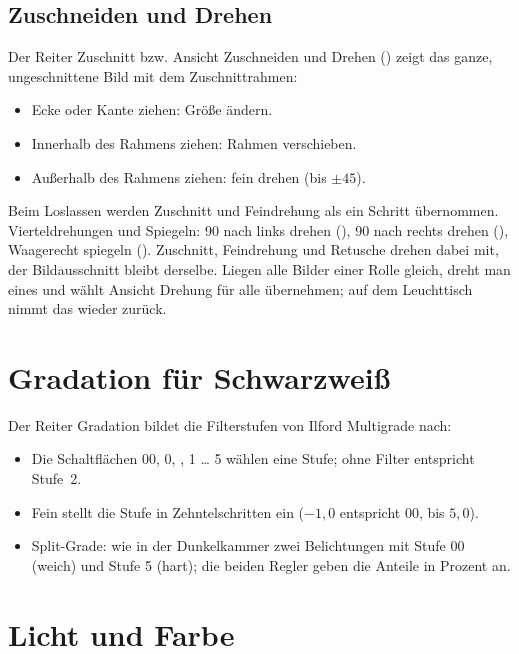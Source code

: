 \documentclass[a4paper,11pt,parskip=half,DIV=12]{scrartcl}
\newcommand{\menu}[1]{\textsf{#1}}                    %
\newcommand{\taste}[1]{\fbox{\footnotesize\textsf{#1}}} %
\begin{document}
\subsection{Zuschneiden und Drehen}
Der Reiter \menu{Zuschnitt} bzw. \menu{Ansicht \textrightarrow{} Zuschneiden und Drehen}
(\taste{C}) zeigt das ganze,
ungeschnittene Bild mit dem Zuschnittrahmen:
\begin{itemize}
  \item Ecke oder Kante ziehen: Größe ändern.
  \item Innerhalb des Rahmens ziehen: Rahmen verschieben.
  \item Außerhalb des Rahmens ziehen: fein drehen (bis $\pm 45$\textdegree).
\end{itemize}
Beim Loslassen werden Zuschnitt und Feindrehung als ein Schritt übernommen.
Vierteldrehungen und Spiegeln: \menu{90\textdegree{} nach links drehen} (\taste{Strg+[}),
\menu{90\textdegree{} nach rechts drehen} (\taste{Strg+]}), \menu{Waagerecht spiegeln}
(\taste{Strg+H}). Zuschnitt, Feindrehung und Retusche drehen dabei mit, der Bildausschnitt bleibt derselbe.
Liegen alle Bilder einer Rolle gleich, dreht man eines und wählt
\menu{Ansicht \textrightarrow{} Drehung für alle übernehmen}; auf dem Leuchttisch nimmt
\taste{Strg+Z} das wieder zurück.

\section{Gradation für Schwarzweiß}

Der Reiter \menu{Gradation} bildet die Filterstufen von Ilford Multigrade nach:
\begin{itemize}
  \item Die Schaltflächen \menu{00}, \menu{0}, \menu{\textonehalf}, \menu{1} … \menu{5} wählen
        eine Stufe; \menu{ohne Filter} entspricht Stufe~2.
  \item \menu{Fein} stellt die Stufe in Zehntelschritten ein ($-1{,}0$ entspricht 00, bis $5{,}0$).
  \item \menu{Split-Grade}: wie in der Dunkelkammer zwei Belichtungen mit Stufe 00 (weich) und
        Stufe 5 (hart); die beiden Regler geben die Anteile in Prozent an.
\end{itemize}

\section{Licht und Farbe}
\end{document}
